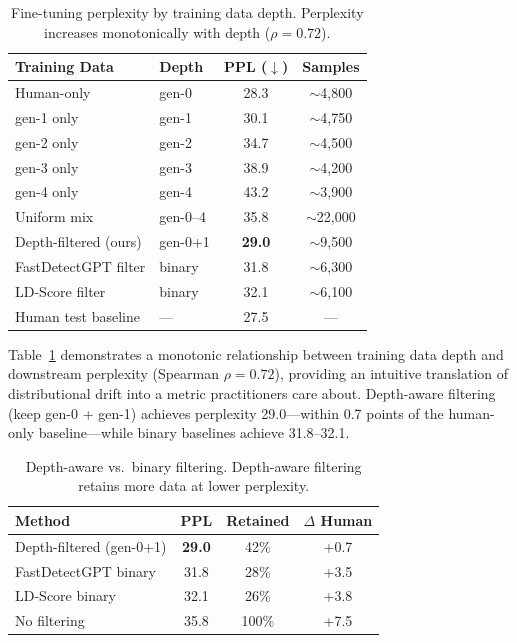 \documentclass[letterpaper, 10pt]{article}
\begin{document}
\begin{table}[t]
\centering
\caption{Fine-tuning perplexity by training data depth. Perplexity increases monotonically with depth ($\rho = 0.72$).}
\label{tab:ppl}
\small
\begin{tabular}{@{}llcc@{}}
\toprule
Training Data & Depth & PPL ($\downarrow$) & Samples \\
\midrule
Human-only & gen-0 & 28.3 & $\sim$4{,}800 \\
gen-1 only & gen-1 & 30.1 & $\sim$4{,}750 \\
gen-2 only & gen-2 & 34.7 & $\sim$4{,}500 \\
gen-3 only & gen-3 & 38.9 & $\sim$4{,}200 \\
gen-4 only & gen-4 & 43.2 & $\sim$3{,}900 \\
Uniform mix & gen-0--4 & 35.8 & $\sim$22{,}000 \\
\midrule
Depth-filtered (ours) & gen-0+1 & \textbf{29.0} & $\sim$9{,}500 \\
FastDetectGPT filter & binary & 31.8 & $\sim$6{,}300 \\
LD-Score filter & binary & 32.1 & $\sim$6{,}100 \\
\midrule
Human test baseline & --- & 27.5 & --- \\
\bottomrule
\end{tabular}
\end{table}

Table~\ref{tab:ppl} demonstrates a monotonic relationship between training data depth and downstream perplexity (Spearman $\rho = 0.72$), providing an intuitive translation of distributional drift into a metric practitioners care about.
Depth-aware filtering (keep gen-0 + gen-1) achieves perplexity 29.0---within 0.7 points of the human-only baseline---while binary baselines achieve 31.8--32.1.

\begin{table}[t]
\centering
\caption{Depth-aware vs.\ binary filtering. Depth-aware filtering retains more data at lower perplexity.}
\label{tab:filter}
\small
\begin{tabular}{@{}lccc@{}}
\toprule
Method & PPL & Retained & $\Delta$ Human \\
\midrule
Depth-filtered (gen-0+1) & \textbf{29.0} & 42\% & +0.7 \\
FastDetectGPT binary & 31.8 & 28\% & +3.5 \\
LD-Score binary & 32.1 & 26\% & +3.8 \\
No filtering & 35.8 & 100\% & +7.5 \\
\bottomrule
\end{tabular}
\end{table}
\end{document}
